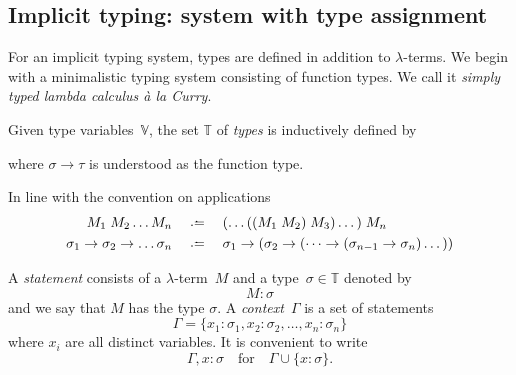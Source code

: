 \subsection{Implicit typing: system with type assignment}
For an implicit typing system, types are defined in addition to $\lambda$-terms.
We begin with a minimalistic typing system consisting of function types. We call it
\emph{simply typed lambda calculus \textit{\`a la} Curry}.
\begin{definition}
  Given type variables~$\mathbb{V}$, the set $\mathbb{T}$ of
  \emph{types} is inductively defined by
  \begin{multicols}{2}
    \begin{prooftree}
    \end{prooftree}
    \begin{prooftree}
    \end{prooftree}
  \end{multicols}
  where $\sigma\to\tau$ is understood as the function type.
\end{definition}
\begin{convention}
  In line with the convention on applications
  \begin{align*}
    M_1\;M_2 \dots M_n \quad &\defeq\quad
    (\dots ((M_1\;M_2)\;M_3) \dots)\; M_n \\
    \sigma_1 \to \sigma_2 \to \dots \sigma_n
    \quad & \defeq\quad \sigma_1 \to (\sigma_2 \to (
    \dots \to (\sigma_{n-1} \to \sigma_n)\dots))
  \end{align*}
\end{convention}
\begin{definition}
    A \emph{statement} consists of a $\lambda$-term~$M$ and a type~$\sigma \in
    \mathbb{T}$ denoted by 
      \[
        M : \sigma
      \]
    and we say that $M$ has the type $\sigma$.  A \emph{context}~$\Gamma$ is a
    set of statements 
      \[
        \Gamma = \{x_1 : \sigma_1, x_2 : \sigma_2, \ldots, x_n : \sigma_n\}
      \]
      where $x_i$ are all distinct variables. It is convenient to write 
      \[
        \Gamma, x : \sigma\quad\text{for}\quad\Gamma\cup \{x : \sigma\}.
      \]
\end{definition}
